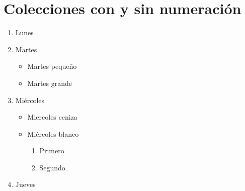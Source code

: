 \documentclass[10pt,a4paper]{article}
\begin{document}
\section{Colecciones con y sin numeración}
 
\begin{enumerate}
    \item Lunes
    \item Martes
       \begin{itemize}
         \item Martes pequeño
         \item Martes grande
       \end{itemize}
    \item Miércoles
       \begin{itemize}
         \item Miercoles ceniza
         \item Miércoles blanco
               \begin{enumerate}
                  \item Primero
                  \item Segundo
               \end{enumerate}
       \end{itemize}
    \item Jueves
\end{enumerate}

 
 
 
 
 
 
 
 
 
 
 
 
 
\end{document}
